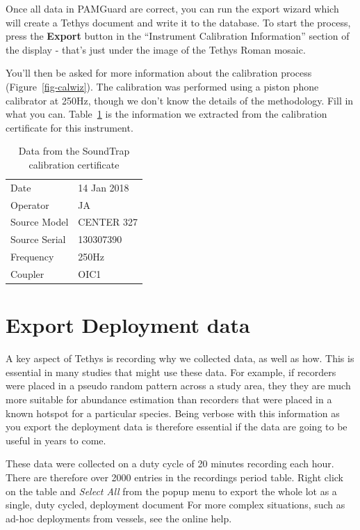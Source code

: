 \documentclass[
]{article}
\begin{document}
Once all data in PAMGuard are correct, you can run the export wizard
which will create a Tethys document and write it to the database. To
start the process, press the \textbf{Export} button in the ``Instrument
Calibration Information'' section of the display - that's just under the
image of the Tethys Roman mosaic.

You'll then be asked for more information about the calibration process
(Figure~\ref{fig-calwiz}). The calibration was performed using a piston
phone calibrator at 250Hz, though we don't know the details of the
methodology. Fill in what you can. Table~\ref{tbl-caldata} is the
information we extracted from the calibration certificate for this
instrument.

\begin{longtable}[]{@{}ll@{}}
\caption{Data from the SoundTrap calibration
certificate}\label{tbl-caldata}\tabularnewline
\toprule\noalign{}
\endfirsthead
\endhead
\bottomrule\noalign{}
\endlastfoot
Date & 14 Jan 2018 \\
Operator & JA \\
Source Model & CENTER 327 \\
Source Serial & 130307390 \\
Frequency & 250Hz \\
Coupler & OIC1 \\
\end{longtable}

\section{Export Deployment data}\label{sec-deployments}

A key aspect of Tethys is recording why we collected data, as well as
how. This is essential in many studies that might use these data. For
example, if recorders were placed in a pseudo random pattern across a
study area, they they are much more suitable for abundance estimation
than recorders that were placed in a known hotspot for a particular
species. Being verbose with this information as you export the
deployment data is therefore essential if the data are going to be
useful in years to come.

These data were collected on a duty cycle of 20 minutes recording each
hour. There are therefore over 2000 entries in the recordings period
table. Right click on the table and \emph{Select All} from the popup
menu to export the whole lot as a single, duty cycled, deployment
document For more complex situations, such as ad-hoc deployments from
vessels, see the online help.
\end{document}
